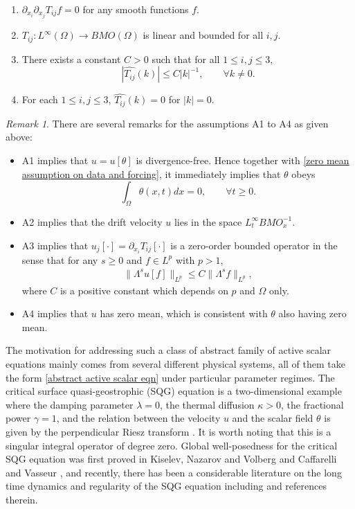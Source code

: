 \documentclass[reqno]{amsart}%
\theoremstyle{definition}
\theoremstyle{remark}
\numberwithin{equation}{section}
\newtheorem{remark}[theorem]{Remark}
\newcommand{\1}{\mathbf{1}}
\numberwithin{equation}{section}
\numberwithin{theorem}{section}
\numberwithin{figure}{section}
\begin{document}
\begin{enumerate}
\item[A1.]  $\partial_{x_i}\partial_{x_j} T_{ij}f=0$ for any smooth functions $f$.
\item[A2.] $T_{ij}:L^\infty(\Omega)\rightarrow BMO(\Omega)$ is linear and bounded for all $i,j$.
\item[A3.] There exists a constant $C>0$ such that for all $1\le i,j\le 3$, $$|\widehat{T_{ij}}(k)|\le C|k|^{-1}, \qquad\forall k\neq0.$$
\item[A4.] For each $1\le i,j\le 3$, $\widehat{T_{ij}}(k)=0$ for $|k|=0$. 
\end{enumerate}
\begin{remark}
There are several remarks for the assumptions A1 to A4 as given above:
\begin{itemize}
\item A1 implies that $u=u[\theta]$ is divergence-free. Hence together with \eqref{zero mean assumption on data and forcing}, it immediately implies that $\theta$ obeys
\begin{equation}\label{zero mean assumption}
\int_{\Omega}\theta(x,t)dx=0,\qquad\forall t\ge0. 
\end{equation}
\item A2 implies that the drift velocity $u$ lies in the space $L^{\infty}_t BMO^{-1}_x$.
\item A3 implies that $u_j[\cdot]=\partial_{x_i} T_{ij}[\cdot]$ is a zero-order bounded operator in the sense that for any $s\ge0$ and $f\in L^p$ with $p>1$,
\begin{align}\label{zero order bounded for u when nu>0}
\|\Lambda^s u[f]\|_{L^p}\le C\|\Lambda^{s}f\|_{L^p},
\end{align}
where $C$ is a positive constant which depends on $p$ and $\Omega$ only.
\item A4 implies that $u$ has zero mean, which is consistent with $\theta$ also having zero mean.
\end{itemize}
\end{remark}

The motivation for addressing such a class of abstract family of active scalar equations mainly comes from several different physical systems, all of them take the form \eqref{abstract active scalar eqn} under particular parameter regimes. The critical surface quasi-geostrophic (SQG) equation is a two-dimensional example where the damping parameter $\lambda=0$, the thermal diffusion $\kappa>0$, the fractional power $\gamma=1$, and the relation between the velocity $u$ and the scalar field $\theta$ is given by the perpendicular Riesz transform \cite{CMT94}. It is worth noting that this is a singular integral operator of degree zero. Global well-posedness for the critical SQG equation was first proved in Kiselev, Nazarov and Volberg \cite{KFV07} and Caffarelli and Vasseur \cite{CV10}, and recently, there has been a considerable literature on the long time dynamics and regularity of the SQG equation including \cite{CIN25, CZ24, CLO25, JZ24, ZL25} and references therein.
\end{document}
